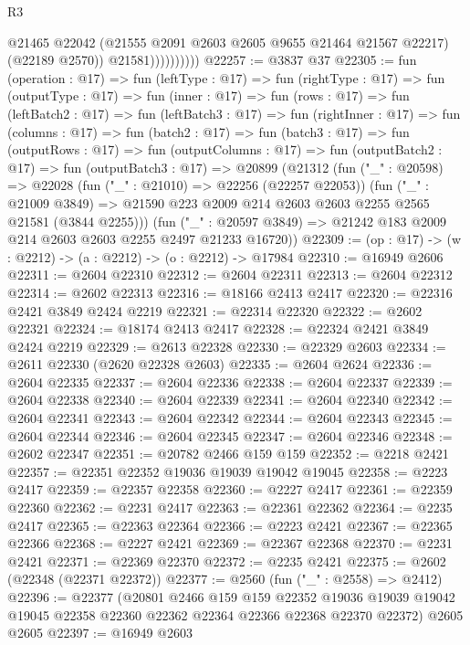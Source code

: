 \begin{lexlean}{R3}
\begin{coremodule}
                          @21465
                          @22042
                          (@21555 @2091 @2603 @2605 @9655 @21464 @21567 @22217)
                          (@22189 @2570))
                        @21581))))))))))
@22257 := @3837 @37
@22305 := fun (operation : @17) =>
  fun (leftType : @17) =>
  fun (rightType : @17) =>
  fun (outputType : @17) =>
  fun (inner : @17) =>
  fun (rows : @17) =>
  fun (leftBatch2 : @17) =>
  fun (leftBatch3 : @17) =>
  fun (rightInner : @17) =>
  fun (columns : @17) =>
  fun (batch2 : @17) =>
  fun (batch3 : @17) =>
  fun (outputRows : @17) =>
  fun (outputColumns : @17) =>
  fun (outputBatch2 : @17) =>
  fun (outputBatch3 : @17) =>
  @20899
    (@21312
      (fun ("_" : @20598) =>
      @22028
        (fun ("_" : @21010) => @22256 (@22257 @22053))
        (fun ("_" : @21009 @3849) =>
        @21590 @223 @2009 @214 @2603 @2603 @2255 @2565 @21581 (@3844 @2255)))
      (fun ("_" : @20597 @3849) => @21242 @183 @2009 @214 @2603 @2603 @2255 @2497 @21233 @16720))
@22309 := (op : @17) -> (w : @2212) -> (a : @2212) -> (o : @2212) -> @17984
@22310 := @16949 @2606
@22311 := @2604 @22310
@22312 := @2604 @22311
@22313 := @2604 @22312
@22314 := @2602 @22313
@22316 := @18166 @2413 @2417
@22320 := @22316 @2421 @3849 @2424 @2219
@22321 := @22314 @22320
@22322 := @2602 @22321
@22324 := @18174 @2413 @2417
@22328 := @22324 @2421 @3849 @2424 @2219
@22329 := @2613 @22328
@22330 := @22329 @2603
@22334 := @2611 @22330 (@2620 @22328 @2603)
@22335 := @2604 @2624
@22336 := @2604 @22335
@22337 := @2604 @22336
@22338 := @2604 @22337
@22339 := @2604 @22338
@22340 := @2604 @22339
@22341 := @2604 @22340
@22342 := @2604 @22341
@22343 := @2604 @22342
@22344 := @2604 @22343
@22345 := @2604 @22344
@22346 := @2604 @22345
@22347 := @2604 @22346
@22348 := @2602 @22347
@22351 := @20782 @2466 @159 @159
@22352 := @2218 @2421
@22357 := @22351 @22352 @19036 @19039 @19042 @19045
@22358 := @2223 @2417
@22359 := @22357 @22358
@22360 := @2227 @2417
@22361 := @22359 @22360
@22362 := @2231 @2417
@22363 := @22361 @22362
@22364 := @2235 @2417
@22365 := @22363 @22364
@22366 := @2223 @2421
@22367 := @22365 @22366
@22368 := @2227 @2421
@22369 := @22367 @22368
@22370 := @2231 @2421
@22371 := @22369 @22370
@22372 := @2235 @2421
@22375 := @2602 (@22348 (@22371 @22372))
@22377 := @2560 (fun ("_" : @2558) => @2412)
@22396 := @22377
    (@20801
      @2466
      @159
      @159
      @22352
      @19036
      @19039
      @19042
      @19045
      @22358
      @22360
      @22362
      @22364
      @22366
      @22368
      @22370
      @22372)
    @2605
    @2605
@22397 := @16949 @2603

\end{coremodule}
\end{lexlean}
